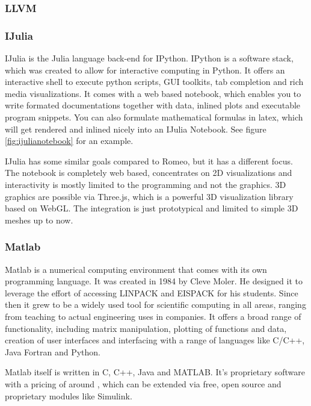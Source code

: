 \subsubsection{\ac{LLVM}}

\subsubsection{IJulia}
IJulia is the Julia language back-end for IPython.
IPython is a software stack, which was created to allow for interactive computing in Python.
It offers an interactive shell to execute python scripts, \ac{GUI} toolkits, tab completion and rich media visualizations.
It comes with a web based notebook, which enables you to write formated documentations together with data, inlined plots and executable program snippets. You can also formulate mathematical formulas in latex, which will get rendered and inlined nicely into an IJulia Notebook.
See figure \ref{fig:ijulianotebook} for an example.

IJulia has some similar goals compared to Romeo, but it has a different focus.
The notebook is completely web based, concentrates on 2D visualizations and interactivity is mostly limited to the programming and not the graphics.
3D graphics are possible via Three.js, which is a powerful 3D visualization library based on WebGL.
The integration is just prototypical and limited to simple 3D meshes up to now.


\subsubsection{Matlab}

\ac{Matlab} is a numerical computing environment that comes with its own programming language.
It was created in 1984 by Cleve Moler. He designed it to leverage the effort of accessing LINPACK and EISPACK for his students.
Since then it grew to be a widely used tool for scientific computing in all areas, ranging from teaching to actual engineering uses in companies.
It offers a broad range of functionality, including matrix manipulation, plotting of functions and data, creation of user interfaces and interfacing with a range of languages like C/C++, Java Fortran and Python.

\ac{Matlab} itself is written in C, C++, Java and MATLAB.
It's proprietary software with a pricing of around \cite{MatlabPricing}, which can be extended via free, open source and proprietary modules like Simulink.

